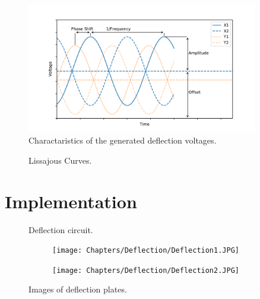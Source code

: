 \begin{figure}[ht]
	\centering
		\includegraphics[width=0.9\textwidth]{Chapters/Deflection/VoltageAspects}
	\caption{Charactaristics of the generated deflection voltages.}
	\label{fig:VoltageAspects}
\end{figure}


\begin{figure}[ht]
	\centering
	
	\begin{tikzpicture}
		
	\end{tikzpicture}
	
	\caption{Lissajous Curves.}
	\label{fig:Lissajous Curves}
\end{figure}

\section{Implementation}

\begin{figure}[ht]
	\centering
	
	\begin{tikzpicture}
		
	\end{tikzpicture}
	\caption{Deflection circuit.}
	\label{fig:deflec_circuit}
\end{figure}

\begin{figure}[ht]
	\centering
	\begin{subfigure}{0.4\textwidth}
		\centering
		\texttt{[image: Chapters/Deflection/Deflection1.JPG]}
		\caption{}
	\end{subfigure}
	\hspace{0.1\textwidth}
	\begin{subfigure}{0.4\textwidth}
		\centering
		\texttt{[image: Chapters/Deflection/Deflection2.JPG]}
		\caption{}
	\end{subfigure}
	\caption{Images of deflection plates.}
	\label{fig:deflection plates}
\end{figure}


